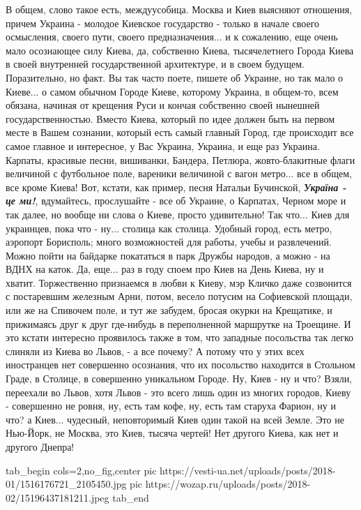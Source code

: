 В общем, слово такое есть, междуусобица.  Москва и Киев выясняют отношения,
причем Украина - молодое Киевское государство - только в начале своего
осмысления, своего пути, своего предназначения... и к сожалению, еще очень мало
осознающее силу Киева, да, собственно Киева, тысячелетнего Города Киева в своей
внутренней государственной архитектуре, и в своем будущем. Поразительно, но
факт. Вы так часто поете, пишете об Украине, но так мало о Киеве... о самом
обычном Городе Киеве, которому Украина, в общем-то, всем обязана, начиная от
крещения Руси и кончая собственно своей нынешней государственностью. Вместо
Киева, который по идее должен быть на первом месте в Вашем сознании, который
есть самый главный Город, где происходит все самое главное и интересное, у Вас
Украина, Украина, и еще раз Украина. Карпаты, красивые песни, вишиванки,
Бандера, Петлюра, жовто-блакитные флаги величиной с футбольное поле, вареники
величиной с вагон метро... все в общем, все кроме Киева! Вот, кстати,
как пример, песня Натальи Бучинской, \emph{\textbf{Україна - це ми!}},
вдумайтесь, прослушайте - все об Украине, о Карпатах, Черном море и так далее,
но вообще ни слова о Киеве, просто удивительно! Так что... Киев для украинцев,
пока что - ну... столица как столица. Удобный город, есть метро, аэропорт
Борисполь; много возможностей для работы, учебы и развлечений. Можно пойти на
байдарке покататься в парк Дружбы народов, а можно - на ВДНХ на каток. Да,
еще... раз в году споем про Киев на День Киева, ну и хватит. Торжественно
признаемся в любви к Киеву, мэр Кличко даже созвонится с постаревшим железным
Арни, потом, весело потусим на Софиевской площади, или же на Спивочем поле, и
тут же забудем, бросая окурки на Крещатике, и прижимаясь друг к друг где-нибудь
в переполненной маршрутке на Троещине. И это кстати интересно проявилось также
в том, что западные посольства так легко слиняли из Киева во Львов, -  а все
почему? А потому что у этих всех иностранцев нет совершенно осознания, что их
посольство находится в Стольном Граде, в Столице, в совершенно уникальном
Городе. Ну, Киев - ну и что?  Взяли, переехали во Львов, хотя Львов - это всего
лишь один из многих городов, Киеву - совершенно не ровня, ну, есть там кофе,
ну, есть там старуха Фарион, ну и что? а Киев...  чудесный, неповторимый Киев
один такой на всей Земле. Это не Нью-Йорк, не Москва, это Киев, тысяча чертей!
Нет другого Киева, как нет и другого Днепра!

\ifcmt
  tab_begin cols=2,no_fig,center
     pic https://vesti-ua.net/uploads/posts/2018-01/1516176721_2105450.jpg
		 pic https://wozap.ru/uploads/posts/2018-02/15196437181211.jpeg 
  tab_end
\fi

